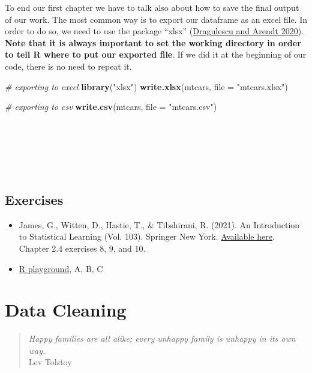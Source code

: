 \documentclass[
]{article}
\newenvironment{Shaded}{\begin{snugshade}}{\end{snugshade}}
\newcommand{\AttributeTok}[1]{\textcolor[rgb]{0.13,0.29,0.53}{#1}}
\newcommand{\CommentTok}[1]{\textcolor[rgb]{0.56,0.35,0.01}{\textit{#1}}}
\newcommand{\FunctionTok}[1]{\textcolor[rgb]{0.13,0.29,0.53}{\textbf{#1}}}
\newcommand{\NormalTok}[1]{#1}
\newcommand{\StringTok}[1]{\textcolor[rgb]{0.31,0.60,0.02}{#1}}
\providecommand{\tightlist}{%
  \setlength{\itemsep}{0pt}\setlength{\parskip}{0pt}}
\begin{document}
To end our first chapter we have to talk also about how to save the
final output of our work. The most common way is to export our dataframe
as an excel file. In order to do so, we need to use the package
``xlsx'' (\protect\hyperlink{ref-dragulescu2020}{Dragulescu and Arendt 2020}). \textbf{Note that it is always important to set the
working directory in order to tell R where to put our exported file}.
If we did it at the beginning of our code, there is no need to repeat
it.

\begin{Shaded}
\begin{Highlighting}[]
\CommentTok{\# exporting to excel}
\FunctionTok{library}\NormalTok{(}\StringTok{"xlsx"}\NormalTok{)}
\FunctionTok{write.xlsx}\NormalTok{(mtcars, }\AttributeTok{file =} \StringTok{"mtcars.xlsx"}\NormalTok{)}

\CommentTok{\# exporting to csv}
\FunctionTok{write.csv}\NormalTok{(mtcars, }\AttributeTok{file =} \StringTok{"mtcars.csv"}\NormalTok{)}
\end{Highlighting}
\end{Shaded}

~

~

~

\hypertarget{exercises}{%
\subsection{Exercises}\label{exercises}}

\begin{itemize}
\tightlist
\item
  James, G., Witten, D., Hastie, T., \& Tibshirani, R. (2021). An
  Introduction to Statistical Learning (Vol. 103). Springer New York.
  \href{https://www.statlearning.com}{Available here}. Chapter 2.4 exercises 8, 9, and 10.
\item
  \href{https://federicoroscioli.shinyapps.io/exercises/}{R playground}, A, B, C
\end{itemize}

\newpage

\hypertarget{data-cleaning}{%
\section{Data Cleaning}\label{data-cleaning}}

\begin{quote}
\emph{Happy families are all alike; every unhappy family is unhappy in its
own way.}\\
Lev Tolstoy
\end{quote}
\end{document}
